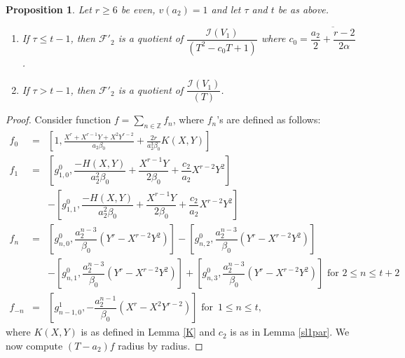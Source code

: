 \documentclass[11pt, reqno]{amsart}
\numberwithin{equation}{section}
\newcommand{\Z}{\mathbb{Z}}
\newtheorem{prop}[thm]{Proposition}
\theoremstyle{definition}
\theoremstyle{remark}
\theoremstyle{definition}
\theoremstyle{remark}
\theoremstyle{remark}
\begin{document}
\begin{prop}\label{F2'}
    Let $r\geq6$ be even, $v(a_{2})=1$ and let $\tau$ and $t$ be as above.
    \begin{enumerate}
        \item If $\tau\leq t-1$, then $\mathcal{F'}_{2}$ is a quotient of $\dfrac{\mathcal{I}(V_{1})}{(T^{2}-c_{0}T+1)}$ where $c_{0} = \overline{\dfrac{a_{2}}{2} + \dfrac{r-2}{2\alpha}}$ .
        \item If $\tau>t-1$, then $\mathcal{F'}_{2}$ is a quotient of $\dfrac{\mathcal{I}(V_{1})}{(T)}$.                             \end{enumerate}
\end{prop}
\begin{proof}
Consider function $f=\underset{n\in\Z}\sum f_n$, where $f_n$'s are defined as follows:
\begin{eqnarray}
f_{0}&=& \left[1, \frac{X^{r}+X^{r-1}Y+X^{2}Y^{r-2}}{a_{2}\beta_{0}} + \frac{2r}{a_{2}^{3}\beta_{0}}K(X,Y)\right]\nonumber\\
f_{1} &=& \left[g_{1,0}^{0}, \dfrac{-H(X,Y)}{a_{2}^{2}\beta_{0}}+ \dfrac{X^{r-1}Y}{2\beta_{0}}+ \dfrac{c_{2}}{a_{2}}X^{r-2}Y^{2}\right]\label{F2'eqeven}\\
& & - \left[g_{1,1}^{0},  \dfrac{-H(X,Y)}{a_{2}^{2}\beta_{0}}+ \dfrac{X^{r-1}Y}{2\beta_{0}}+  \dfrac{c_{2}}{a_{2}}X^{r-2}Y^{2}                \right]  \nonumber\\
f_{n} &=& \left[g_{n,0}^{0}, \dfrac{a_{2}^{n-3}}{\beta_{0}}(Y^{r}-X^{r-2}Y^{2})\right] -  \left[g_{n,2}^{0}, \dfrac{a_{2}^{n-3}}{\beta_{0}}(Y^{r}-X^{r-2}Y^{2})\right] \nonumber\\ 
& & - \left[g_{n,1}^{0}, \dfrac{a_{2}^{n-3}}{\beta_{0}}(Y^{r}-X^{r-2}Y^{2})\right] +  \left[g_{n,3}^{0}, \dfrac{a_{2}^{n-3}}{\beta_{0}}(Y^{r}-X^{r-2}Y^{2})\right]\text{ for } 2\leq n \leq t+2 \nonumber\\
f_{-n} &= &\left[g_{n-1,0}^{1}, -\dfrac{a_{2}^{n-1}}{\beta_{0}}(X^{r}-X^{2}Y^{r-2})\right] \text{ for }\,1 \leq n\leq t,\nonumber
\end{eqnarray}
where $K(X,Y)$ is as defined in Lemma \ref{K} and $c_{2}$ is as in Lemma \ref{sl1par}.
We now compute  $(T-a_{2})f$ radius by radius.


\end{proof}
\end{document}

